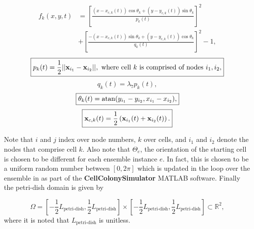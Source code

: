 \begin{equation}
    \boxed{
    \begin{split}
    f_k(x,y,t) &= \left[\frac{ (x-x_{c,k}(t))\cos{\theta_k} + (y-y_{c,k}(t)) \sin{\theta_k}}{p_k(t)} \right]^2 \\ 
               &+ \left[ \frac{-(x-x_{c,k}(t))\sin{\theta_k} +(y-y_{c,k}(t)) \cos{\theta_k}}{q_k(t)} \right]^2 - 1,
    \end{split}
    }
\end{equation}
\begin{equation}\label{eqn:semiMajorAxis}
    \boxed{p_k(t) = \frac{1}{2}||\vb{x}_{i_1} - \vb{x}_{i_2}||, \ 
    \textrm{where cell} \ k \ \textrm{is comprised of nodes} \ i_1, i_2,} 
\end{equation}
\begin{equation}\label{eqn:semiMinorAxis}
    \boxed{q_k(t) = \lambda_7 p_k(t), }
\end{equation}
\begin{equation}\label{eqn:orientationAngle}
    \boxed{\theta_k(t) = \atan (y_{i_1} - y_{i_2},x_{i_1} - x_{i_2} ), }
\end{equation}
\begin{equation} \label{eqn:centerPos}
    \boxed{ \vb{x}_{c,k}(t) = \frac{1}{2} \left(\vb{x}_{i_1}(t) + \vb{x}_{i_2}(t)\right). }
\end{equation}

Note that $i$ and $j$ index over node numbers, $k$ over cells, and $i_1$ and $i_2$ denote the nodes
that comprise cell $k$. Also note that $\Theta_e$, the orientation of the starting cell
is chosen to be different for each ensemble instance $e$. In fact,
this is chosen to be a uniform random number between $[0,2\pi]$ which
is updated in the loop over the ensemble in \codeword{Master.m} as part of the \textbf{CellColonySimulator}
MATLAB software.
Finally the petri-dish domain is given by 

\begin{equation}
    \boxed{\Omega = \left[-\frac{1}{2}L_{\textrm{petri-dish}},\frac{1}{2}L_{\textrm{petri-dish}} \right] \times
             \left[-\frac{1}{2}L_{\textrm{petri-dish}},\frac{1}{2}L_{\textrm{petri-dish}} \right] \subset \mathbb{R}^2,}
\end{equation}
where it is noted that $L_{\textrm{petri-dish}}$ is unitless.


